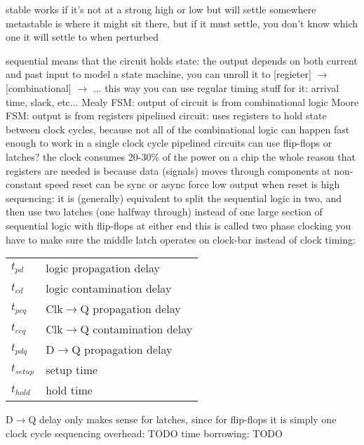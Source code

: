 \documentclass[12pt]{article}
\begin{document}
\begin{spacing}{0.8}
\begin{multicols*}{2}
\begin{flushleft}
\begin{outline}[longenum]
  \1 stable works if it's not at a strong high or low but will settle somewhere
  \1 metastable is where it might sit there, but if it must settle, you don't know which one it will settle to when perturbed

  \1 sequential means that the circuit holds state: the output depends on both current and past input
  \1 to model a state machine, you can unroll it to [regieter] $\rightarrow$ [combinational] $\rightarrow$ ...
    \2 this way you can use regular timing stuff for it: arrival time, slack, etc...
  \1 Mealy FSM: output of circuit is from combinational logic
  \1 Moore FSM: output is from registers
  \1 pipelined circuit: uses registers to hold state between clock cycles, because not all of the combinational logic can happen fast enough to work in a single clock cycle
    \2 pipelined circuits can use flip-flops or latches?
  \1 the clock consumes 20-30\% of the power on a chip
  \1 the whole reason that registers are needed is because data (signals) moves through components at non-constant speed
  \1 reset
    \2 can be sync or async
    \2 force low output when reset is high
  \1 sequencing: it is (generally) equivalent to split the sequential logic in two, and then use two latches (one halfway through) instead of one large section of sequential logic with flip-flops at either end
    \2 this is called two phase clocking
    \2 you have to make sure the middle latch operates on clock-bar instead of clock
  \1 timing: \\
  \begin{tabular}{l l}
    $t_{pd}$ & logic propagation delay \\
    $t_{cd}$ & logic contamination delay \\
    $t_{pcq}$ & Clk$\rightarrow$Q propagation delay \\
    $t_{ccq}$ & Clk$\rightarrow$Q contamination delay \\
    $t_{pdq}$ & D$\rightarrow$Q propagation delay \\
    $t_{setup}$ & setup time \\
    $t_{hold}$ & hold time \\
  \end{tabular}
    \2 D$\rightarrow$Q delay only makes sense for latches, since for flip-flops it is simply one clock cycle
  \1 sequencing overhead: TODO
  \1 time borrowing: TODO










\end{outline}
\end{flushleft}
\end{multicols*}
\end{spacing}
\end{document}
